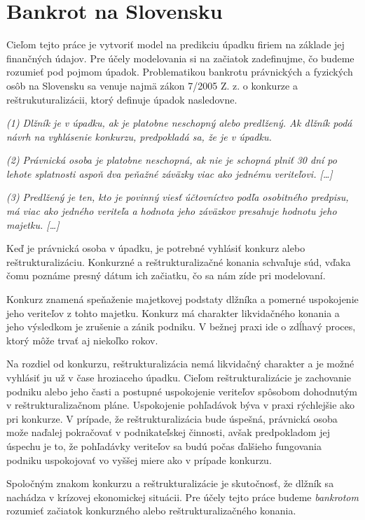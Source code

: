 \section{Bankrot na Slovensku}
\label{bankruptcy}

Cieľom tejto práce je vytvoriť model na predikciu úpadku firiem na základe jej finančných údajov.
Pre účely modelovania si na začiatok zadefinujme, čo budeme rozumieť pod pojmom úpadok.
Problematikou bankrotu právnických a fyzických osôb na Slovensku sa venuje najmä zákon 7/2005 Z. z. o konkurze a reštrukuturalizácii,
ktorý definuje úpadok nasledovne.

\bigskip
\textit{(1)
Dlžník je v úpadku, ak je platobne neschopný alebo predlžený. Ak dlžník podá návrh na vyhlásenie konkurzu, predpokladá sa, že je v úpadku.}

\textit{(2)
Právnická osoba je platobne neschopná, ak nie je schopná plniť 30 dní po lehote splatnosti aspoň dva peňažné záväzky viac ako jednému veriteľovi. […]}

\textit{(3)
Predlžený je ten, kto je povinný viesť účtovníctvo podľa osobitného predpisu, má viac ako jedného veriteľa a hodnota jeho záväzkov presahuje hodnotu jeho majetku. […]}
\bigskip

Keď je právnická osoba v úpadku, je potrebné vyhlásiť konkurz alebo reštrukturalizáciu.
Konkurzné a reštrukturalizačné konania schvaľuje súd, vďaka čomu poznáme presný dátum ich začiatku, čo sa nám zíde pri modelovaní.

Konkurz znamená speňaženie majetkovej podstaty dlžníka a pomerné uspokojenie jeho veriteľov z tohto majetku.
Konkurz má charakter likvidačného konania a jeho výsledkom je zrušenie a zánik podniku.
V bežnej praxi ide o zdĺhavý proces, ktorý môže trvať aj niekoľko rokov.

Na rozdiel od konkurzu, reštrukturalizácia nemá likvidačný charakter a je možné vyhlásiť ju už v čase hroziaceho úpadku.
Cieľom reštrukturalizácie je zachovanie podniku alebo jeho časti a postupné uspokojenie veriteľov spôsobom dohodnutým v reštrukturalizačnom pláne.
Uspokojenie pohľadávok býva v praxi rýchlejšie ako pri konkurze.
V prípade, že reštrukturalizácia bude úspešná, právnická osoba može naďalej pokračovať v podnikateľskej činnosti,
avšak predpokladom jej úspechu je to, že pohľadávky veriteľov sa budú počas ďalšieho fungovania podniku uspokojovať vo vyššej miere ako v prípade konkurzu.

Spoločným znakom konkurzu a reštrukturalizácie je skutočnosť, že dlžník sa nachádza v krízovej ekonomickej situácii.
Pre účely tejto práce budeme \emph{bankrotom} rozumieť začiatok konkurzného alebo reštrukturalizačného konania.

